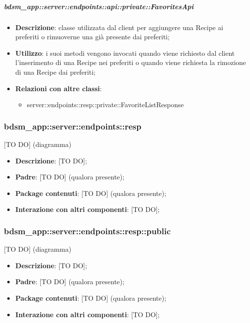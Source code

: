     \subparagraph{bdsm\_app::server::endpoints::api::private::FavoritesApi} %
    \label{subp:bdsm_app_server_endpoints_api_private_favoritesapi}
    \begin{itemize}
      \item \textbf{Descrizione}: classe utilizzata dal client per aggiungere una Recipe ai preferiti o rimuoverne una già presente dai preferiti;
      \item \textbf{Utilizzo}: i suoi metodi vengono invocati quando viene richiesto dal client l'inserimento di una Recipe nei preferiti o quando viene richiesta la rimozione di una Recipe dai preferiti;
      \item \textbf{Relazioni con altre classi}:
        \begin{itemize}
          \item server::endpoints::resp::private::FavoriteListResponse
        \end{itemize}
      \end{itemize}

\subsubsection{bdsm\_app::server::endpoints::resp} %
\label{ssub:bdsm_app_server_endpoints_resp}
[TO DO] (diagramma) \newline \newline

\begin{itemize}
  \item \textbf{Descrizione}: [TO DO];
  \item \textbf{Padre}: [TO DO] (qualora presente);
  \item \textbf{Package contenuti}: [TO DO] (qualora presente);
  \item \textbf{Interazione con altri componenti}: [TO DO];
\end{itemize}

\subsubsection{bdsm\_app::server::endpoints::resp::public} %
\label{ssub:bdsm_app_server_endpoints_resp_public}
[TO DO] (diagramma) \newline \newline

\begin{itemize}
  \item \textbf{Descrizione}: [TO DO];
  \item \textbf{Padre}: [TO DO] (qualora presente);
  \item \textbf{Package contenuti}: [TO DO] (qualora presente);
  \item \textbf{Interazione con altri componenti}: [TO DO];
\end{itemize}

